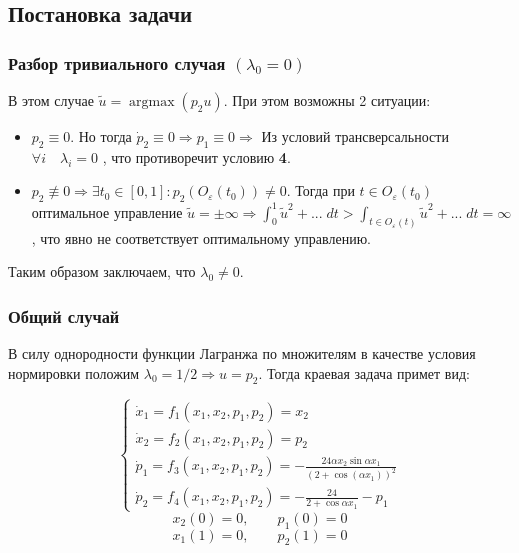 \documentclass[a4paper,12pt]{article}
\DeclareMathOperator*{\argmax}{argmax}
\begin{document}
\subsection*{Постановка задачи}

\subsubsection*{Разбор тривиального случая \((\lambda_0=0)\)}

В этом случае \(\tilde{u}=\argmax(p_2 u)\). При этом возможны 2
ситуации:

\begin{itemize}
\item
  \(p_2 \equiv 0\). Но тогда
  \(\dot{p}_2\equiv 0 \Rightarrow p_1 \equiv 0 \Rightarrow\) Из условий
  трансверсальности \(\forall i \quad \lambda_i=0\) , что противоречит
  условию \textbf{4}.
\item
  \(p_2 \not\equiv 0 \Rightarrow \exists t_0 \in [0, 1] : p_2\left(O_{\varepsilon}(t_0)\right) \neq 0\).
  Тогда при \(t\in O_{\varepsilon}(t_0)\) оптимальное управление
  \(\tilde{u}=\pm\infty \Rightarrow \int_0^1 \tilde{u}^2+...\;dt > \int_{t\in O_\varepsilon(t)}\tilde{u}^2+...\;dt=\infty\),
  что явно не соответствует оптимальному управлению.
\end{itemize}

Таким образом заключаем, что \(\lambda_0 \neq 0\).

\subsubsection*{Общий случай}

В силу однородности функции Лагранжа по множителям в качестве условия
нормировки положим \(\lambda_0=1/2 \Rightarrow u=p_2\). Тогда краевая
задача примет вид:

\begin{equation}
  \label{common_system}
  \begin{cases}
    \dot{x}_1=f_1(x_1,x_2,p_1,p_2)=x_2\\
    \dot{x}_2=f_2(x_1,x_2,p_1,p_2)=p_2 \\
    \dot{p}_1=f_3(x_1,x_2,p_1,p_2)=-\frac{24\alpha x_2\sin{\alpha x_1}}{\left(2+\cos(\alpha x_1)\right)^2}\\
    \dot{p}_2=f_4(x_1,x_2,p_1,p_2)=-\frac{24}{2+\cos{\alpha x_1}}-p_1
    \end{cases}
\end{equation}
\begin{equation}
  \label{left_conditions}
  x_2(0)=0, \quad \quad p_1(0)=0
\end{equation}
\begin{equation}
  \label{right_conditions}
  x_1(1)=0, \quad \quad p_2(1)=0
\end{equation}
\end{document}
